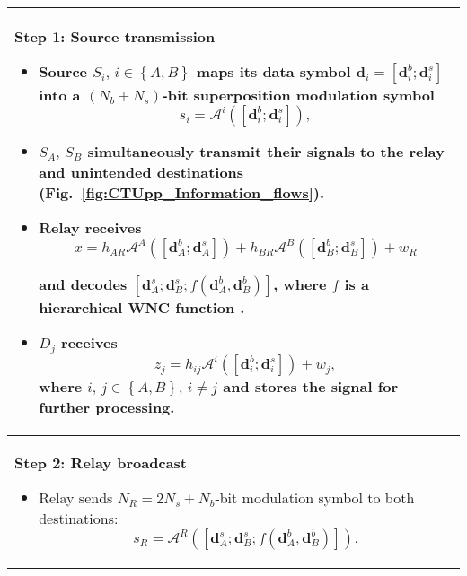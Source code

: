 \begin{table}
\centering{}%
\begin{tabular}{|>{\raggedright}p{}|}
\hline 
\textbf{Step 1: Source transmission}
\begin{itemize}
\item Source $S_{i},\,i\in\left\{ A,B\right\} $ maps its data symbol $\mathbf{d}_{i}=\left[\mathbf{d}_{i}^{b};\mathbf{d}_{i}^{s}\right]$
into a $\left(N_{b}+N_{s}\right)$-bit superposition modulation symbol
\begin{equation}
s_{i}=\mathcal{A}^{i}\left(\left[\mathbf{d}_{i}^{b};\mathbf{d}_{i}^{s}\right]\right),\label{eq:CTUpp_OverallSourceStreams}
\end{equation}

\item $S_{A},\,S_{B}$ simultaneously transmit their signals to the relay
and unintended destinations (Fig.~\ref{fig:CTUpp_Information_flows}).
\item Relay receives
\begin{equation}
x=h_{AR}\mathcal{A}^{A}\left(\left[\mathbf{d}_{A}^{b};\mathbf{d}_{A}^{s}\right]\right)+h_{BR}\mathcal{A}^{B}\left(\left[\mathbf{d}_{B}^{b};\mathbf{d}_{B}^{s}\right]\right)+w_{R}
\end{equation}



and decodes $\left[\mathbf{d}_{A}^{s};\mathbf{d}_{B}^{s};f(\mathbf{d}_{A}^{b},\mathbf{d}_{B}^{b})\right]$,
where $f$ is a hierarchical WNC function \cite{Sykora-Burr_2011-TVT}.

\item $D_{j}$ receives
\begin{equation}
z_{j}=h_{ij}\mathcal{A}^{i}\left(\left[\mathbf{d}_{i}^{b};\mathbf{d}_{i}^{s}\right]\right)+w_{j},\label{eq:CTUpp_Dj_received}
\end{equation}
where $i,\,j\in\left\{ A,B\right\} ,\,i\neq j$ and stores the signal
for further processing.\end{itemize}
\tabularnewline
\hline 
\textbf{Step 2: Relay broadcast}
\begin{itemize}
\item Relay sends $N_{R}=2N_{s}+N_{b}$-bit modulation symbol to both destinations:
\begin{equation}
s_{R}=\mathcal{A}^{R}\left(\left[\mathbf{d}_{A}^{s};\mathbf{d}_{B}^{s};f(\mathbf{d}_{A}^{b},\mathbf{d}_{B}^{b})\right]\right).\label{eq:CTUpp_relay_output}
\end{equation}


\end{itemize}
\end{tabular}
\end{table}
